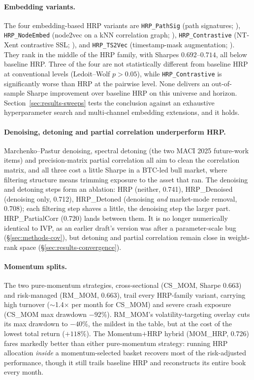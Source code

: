 \documentclass[11pt,a4paper]{article}
\begin{document}
\paragraph{Embedding variants.} The four embedding-based HRP variants
are \texttt{HRP\_PathSig} (path signatures; \citealp{lyons1998}),
\texttt{HRP\_NodeEmbed} (node2vec on a kNN correlation graph;
\citealp{grover2016}), \texttt{HRP\_Contrastive} (NT-Xent contrastive
SSL; \citealp{chen2020}), and \texttt{HRP\_TS2Vec} (timestamp-mask
augmentation; \citealp{yue2022}). They rank in the middle of the HRP
family, with Sharpes $0.692$--$0.714$, all below baseline HRP. Three of
the four are not statistically different from baseline HRP at
conventional levels (Ledoit--Wolf $p>0.05$), while
\texttt{HRP\_Contrastive} is significantly worse than HRP at the
pairwise level. None delivers an out-of-sample Sharpe improvement over
baseline HRP on this universe and horizon. Section~\ref{sec:results-sweeps} tests the conclusion
against an exhaustive hyperparameter search and multi-channel embedding
extensions, and it holds.

\paragraph{Denoising, detoning and partial correlation underperform HRP.}
Marchenko--Pastur denoising, spectral detoning (the two MACI 2025
future-work items) and precision-matrix partial correlation all aim to
clean the correlation matrix, and all three cost a little Sharpe in a
BTC-led bull market, where filtering structure means trimming exposure
to the asset that ran. The denoising and detoning steps form an
ablation: HRP (neither, 0.741), HRP\_Denoised (denoising only, 0.712),
HRP\_Detoned (denoising \emph{and} market-mode removal, 0.708); each
filtering step shaves a little, the denoising step the larger part.
HRP\_PartialCorr (0.720) lands between them. It is no longer numerically
identical to IVP, as an earlier draft's version was after a
parameter-scale bug (\S\ref{sec:methods-cov}), but detoning and partial
correlation remain close in weight-rank space
(\S\ref{sec:results-convergence}).

\paragraph{Momentum splits.} The two pure-momentum strategies,
cross-sectional (CS\_MOM, Sharpe 0.663) and risk-managed (RM\_MOM,
0.663), trail every HRP-family variant, carrying high turnover
($\sim$1.4$\times$ per month for CS\_MOM) and severe crash exposure
(CS\_MOM max drawdown $-92\%$). RM\_MOM's volatility-targeting overlay
\citep{barroso2015momentum} cuts its max drawdown to $-40\%$, the
mildest in the table, but at the cost of the lowest total return
($+118\%$). The Momentum$+$HRP hybrid (MOM\_HRP, 0.726) fares markedly
better than either pure-momentum strategy: running HRP allocation
\emph{inside} a momentum-selected basket recovers most of the
risk-adjusted performance, though it still trails baseline HRP and
reconstructs its entire book every month.
\end{document}
